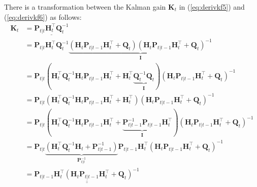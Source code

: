 \documentclass[10pt]{article}
\begin{document}
There is a transformation between the Kalman gain $\mathbf{K}_t$ in (\ref{eq:derivkf5}) and (\ref{eq:derivkf6}) as follows:
\begin{equation} 
	\begin{aligned} 
		\mathbf{K}_t & = \underline{ \mathbf{P}_{t|t} \mathbf{H}_t^{\intercal}\mathbf{Q}_t^{-1} } \\
		& = \mathbf{P}_{t|t} \mathbf{H}_t^{\intercal}\mathbf{Q}_t^{-1} \underbrace{(\mathbf{H}_t\mathbf{P}_{t|t-1}\mathbf{H}_t^{\intercal} + \mathbf{Q}_t)(\mathbf{H}_t\mathbf{P}_{t|t-1}\mathbf{H}_t^{\intercal} + \mathbf{Q}_t)^{-1}}_{\mathbf{I}} \\
		& = \mathbf{P}_{t|t}(\mathbf{H}_t^{\intercal}\mathbf{Q}_t^{-1}\mathbf{H}_t \mathbf{P}_{t|t-1}\mathbf{H}_t^{\intercal} + \mathbf{H}_t^{\intercal} \underbrace{\mathbf{Q}_t^{-1}\mathbf{Q}_t}_{\mathbf{I}})(\mathbf{H}_t\mathbf{P}_{t|t-1}\mathbf{H}_t^{\intercal} + \mathbf{Q}_t)^{-1} \\
		& = \mathbf{P}_{t|t}(\mathbf{H}_t^{\intercal}\mathbf{Q}_t^{-1}\mathbf{H}_t \mathbf{P}_{t|t-1}\mathbf{H}_t^{\intercal} + \mathbf{H}_t^{\intercal}) (\mathbf{H}_t\mathbf{P}_{t|t-1}\mathbf{H}_t^{\intercal} + \mathbf{Q}_t)^{-1} \\
		& = \mathbf{P}_{t|t}(\mathbf{H}_t^{\intercal}\mathbf{Q}_t^{-1}\mathbf{H}_t \mathbf{P}_{t|t-1}\mathbf{H}_t^{\intercal} + \underbrace{\mathbf{P}_{t|t-1}^{-1}\mathbf{P}_{t|t-1}}_{\mathbf{I}} \mathbf{H}_t^{\intercal} )(\mathbf{H}_t\mathbf{P}_{t|t-1}\mathbf{H}_t^{\intercal} + \mathbf{Q}_t)^{-1} \\
		& = \mathbf{P}_{t|t} \underbrace{ (\mathbf{H}_t^{\intercal}\mathbf{Q}_t^{-1}\mathbf{H}_t + \mathbf{P}_{t|t-1}^{-1})}_{\mathbf{P}_{t|t}^{-1}}\mathbf{P}_{t|t-1}\mathbf{H}_t^{\intercal} (\mathbf{H}_t\mathbf{P}_{t|t-1}\mathbf{H}_t^{\intercal} + \mathbf{Q}_t)^{-1} \\ 
		& =  \underline{\underline{ \mathbf{P}_{t|t-1}\mathbf{H}_t^{\intercal} (\mathbf{H}_t\mathbf{P}_{t|t-1}\mathbf{H}_t^{\intercal} + \mathbf{Q}_t)^{-1}  }}
	\end{aligned} 
\end{equation}
\end{document}

